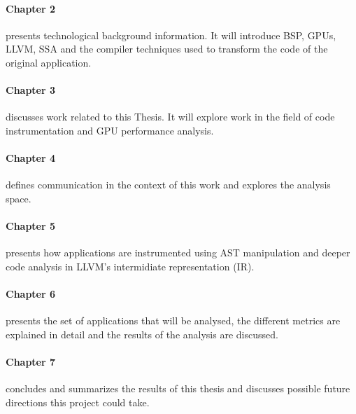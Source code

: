 	\paragraph{Chapter 2} presents technological background information. It will introduce BSP, GPUs, LLVM, SSA and the compiler techniques used to transform the code of the original application.
	\paragraph{Chapter 3} discusses work related to this Thesis. It will explore work in the field of code instrumentation and GPU performance analysis.
	\paragraph{Chapter 4} defines communication in the context of this work and explores the analysis space.
	\paragraph{Chapter 5} presents how applications are instrumented using AST manipulation and deeper code analysis in LLVM's intermidiate representation (IR).
	\paragraph{Chapter 6} presents the set of applications that will be analysed, the different metrics are explained in detail and the results of the analysis are discussed.
	\paragraph{Chapter 7} concludes and summarizes the results of this thesis and discusses possible future directions this project could take.
